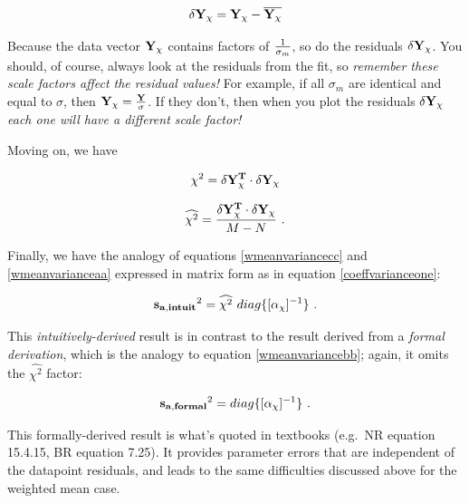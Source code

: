 \documentclass[psfig,preprint]{aastex}
\begin{document}
\begin{mathletters}
\begin{equation} 
\delta {\bf Y_\chi} = {\bf Y_\chi} -  \overline {\bf Y_\chi} 
\end{equation}

\noindent Because the data vector $\bf Y_\chi$ contains factors of $1
\over \sigma_m$, so do the residuals $\delta {\bf Y_\chi}$.  You should,
of course, always look at the residuals from the fit, so {\it remember
these scale factors affect the residual values!} For example, if all
$\sigma_m$ are identical and equal to $\sigma$, then ${\bf Y_\chi} =
{\bf Y \over \sigma}$. If they don't, then when you plot the residuals
$\delta {\bf Y_\chi}$ {\it each one will have a different scale factor!}

	Moving on, we have

\begin{equation}
\label{chisq}
\chi^2 =  {\bf \delta Y_\chi^T \cdot \delta Y_\chi}
\end{equation}

\begin{equation}
\label{reducedchisq}
\widehat{\chi^2} = { {\bf \delta Y_\chi^T \cdot \delta Y_\chi} \over M-N} \ .
\end{equation}
\end{mathletters}

\noindent Finally, we have the analogy of equations
\ref{wmeanvariancecc} and \ref{wmeanvarianceaa} expressed in matrix form as
in equation \ref{coeffvarianceone}:

\begin{equation} \label{coeffvariancegood}
{\bf s_{a,intuit}}^2 = \widehat{\chi^2} \ diag \{[\alpha_\chi]^{-1} \}  \ .
\end{equation}

\noindent This {\it intuitively-derived} result is in contrast to the
result derived from a {\it formal derivation}, which is the analogy to
equation \ref{wmeanvariancebb}; again, it omits the $\widehat{\chi^2}$
factor: 

\begin{equation} \label{coeffvarianceawful}
{\bf s_{a,formal}}^2 = diag \{[\alpha_\chi]^{-1} \} \ .
\end{equation}

\noindent This formally-derived result is what's quoted in textbooks
(e.g.\ NR equation 15.4.15, BR equation 7.25). It provides parameter
errors that are independent of the datapoint residuals, and leads to the
same difficulties discussed above for the weighted mean case.
\end{document}
